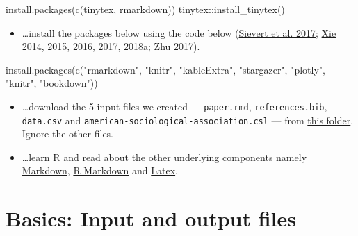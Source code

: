 \documentclass[
  12pt,
]{article}
\newenvironment{Shaded}{\begin{snugshade}}{\end{snugshade}}
\newcommand{\FunctionTok}[1]{\textcolor[rgb]{0.00,0.00,0.00}{#1}}
\newcommand{\NormalTok}[1]{#1}
\newcommand{\SpecialCharTok}[1]{\textcolor[rgb]{0.00,0.00,0.00}{#1}}
\newcommand{\StringTok}[1]{\textcolor[rgb]{0.31,0.60,0.02}{#1}}
\providecommand{\tightlist}{%
  \setlength{\itemsep}{0pt}\setlength{\parskip}{0pt}}
\begin{document}
\begin{Shaded}
\begin{Highlighting}[]
\FunctionTok{install.packages}\NormalTok{(}\FunctionTok{c}\NormalTok{(}\StringTok{\textquotesingle{}tinytex\textquotesingle{}}\NormalTok{, }\StringTok{\textquotesingle{}rmarkdown\textquotesingle{}}\NormalTok{))}
\NormalTok{tinytex}\SpecialCharTok{::}\FunctionTok{install\_tinytex}\NormalTok{()}
\end{Highlighting}
\end{Shaded}

\begin{itemize}
\tightlist
\item
  \ldots install the packages below using the code below (\protect\hyperlink{ref-plotly}{Sievert et al. 2017}; \protect\hyperlink{ref-knitr3}{Xie 2014}, \protect\hyperlink{ref-knitr2}{2015}, \protect\hyperlink{ref-bookdown2}{2016}, \protect\hyperlink{ref-bookdown1}{2017}, \protect\hyperlink{ref-knitr1}{2018a}; \protect\hyperlink{ref-kableextra}{Zhu 2017}).
\end{itemize}

\begin{Shaded}
\begin{Highlighting}[]
\FunctionTok{install.packages}\NormalTok{(}\FunctionTok{c}\NormalTok{(}\StringTok{"rmarkdown"}\NormalTok{, }\StringTok{"knitr"}\NormalTok{, }\StringTok{"kableExtra"}\NormalTok{,}
                   \StringTok{"stargazer"}\NormalTok{, }\StringTok{"plotly"}\NormalTok{, }\StringTok{"knitr"}\NormalTok{,}
                   \StringTok{"bookdown"}\NormalTok{))}
\end{Highlighting}
\end{Shaded}

\begin{itemize}
\item
  \ldots download the 5 input files we created --- \texttt{paper.rmd}, \texttt{references.bib}, \texttt{data.csv} and \texttt{american-sociological-association.csl} --- from \href{https://drive.google.com/drive/folders/1zJP3cNPrHN-gj0rcmbHQgg-XA0hqDXdd?usp=sharing}{this folder}. Ignore the other files.
\item
  \ldots learn R and read about the other underlying components namely \href{https://en.wikipedia.org/wiki/Markdown}{Markdown}, \href{https://rmarkdown.rstudio.com/lesson-1.html}{R Markdown} and \href{https://en.wikipedia.org/wiki/LaTeX}{Latex}.
\end{itemize}

\hypertarget{basics-input-and-output-files}{%
\section{Basics: Input and output files}\label{basics-input-and-output-files}}
\end{document}
